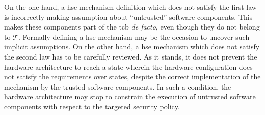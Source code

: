 On the one hand, a \ac{hse} mechanism definition which does not satisfy the
first law is incorrectly making assumption about ``untrusted'' software
components.
%
This makes these components part of the \ac{tcb} \emph{de facto}, even though
they do not belong to $\mathcal{T}$.
%
Formally defining a \ac{hse} mechanism may be the occasion to uncover such
implicit assumptions.
%
On the other hand, a \ac{hse} mechanism which does not satisfy the second law
has to be carefully reviewed.
%
As it stands, it does not prevent the hardware architecture to reach a state
wherein the hardware configuration does not satisfy the requirements over
states, despite the correct implementation of the mechanism by the trusted
software components.
%
In such a condition, the hardware architecture may stop to constrain the
execution of untrusted software components with respect to the targeted security
policy. 

